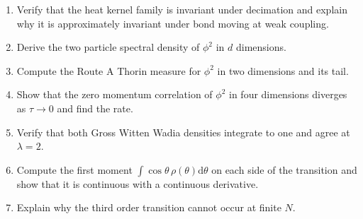 \begin{enumerate}
\item Verify that the heat kernel family is invariant under decimation and explain why it is approximately invariant under bond moving at weak coupling.
\item Derive the two particle spectral density of $\phi^2$ in $d$ dimensions.
\item Compute the Route A Thorin measure for $\phi^2$ in two dimensions and its tail.
\item Show that the zero momentum correlation of $\phi^2$ in four dimensions diverges as $\tau\to0$ and find the rate.
\item Verify that both Gross Witten Wadia densities integrate to one and agree at $\lambda=2$.
\item Compute the first moment $\int\cos\theta\,\rho(\theta)\mathrm d\theta$ on each side of the transition and show that it is continuous with a continuous derivative.
\item Explain why the third order transition cannot occur at finite $N$.
\end{enumerate}
